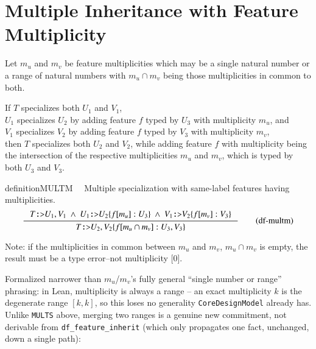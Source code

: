 \section{Multiple Inheritance with Feature Multiplicity}
Let $m_u$ and $m_v$ be feature multiplicities which may be a single natural number or a range of natural numbers with
$m_u\cap m_v$ being those multiplicities in common to both.

If $T$ specializes both $U_1$ and $V_1$, \\
$U_1$ specializes $U_2$ by adding feature $f$ typed by $U_3$ with multiplicity $m_u$, and\\
$V_1$ specializes $V_2$ by adding feature $f$ typed by $V_3$ with multiplicity $m_v$, \\
then $T$ specializes both $U_2$ and $V_2$, while adding feature $f$ with multiplicity being the intersection of the respective multiplicities $m_u$ and $m_v$, which is typed by both $U_3$ and $V_3$.

\begin{restatable}{definition}{MULTM}~~
Multiple specialization with same-label features having multiplicities.
\begin{align}
\inference
{T\texttt{:>}U_1 , V_1~\wedge~U_1\texttt{:>}U_2\{f[m_u]:U_3\}~\wedge~V_1\texttt{:>}V_2\{f[m_v]:V_3\}}
{T\texttt{:>}U_2 , V_2\{f[m_u\cap m_v]:U_3,V_3\}}
\label{eq:df-multm}\tag{df-multm}
\end{align}
\end{restatable}

Note: if the multiplicities in common between $m_u$ and $m_v$, $m_u\cap m_v$ is empty, the result must be a type error--not multiplicity [0].

\pn Formalized narrower than $m_u$/$m_v$'s fully general ``single number or range'' phrasing: in Lean,
multiplicity is always a range -- an exact multiplicity $k$ is the degenerate range $[k,k]$, so this
loses no generality \texttt{CoreDesignModel} already has. Unlike \texttt{MULTS} above, merging two
ranges is a genuine new commitment, not derivable from \texttt{df\_feature\_inherit} (which only
propagates one fact, unchanged, down a single path):

